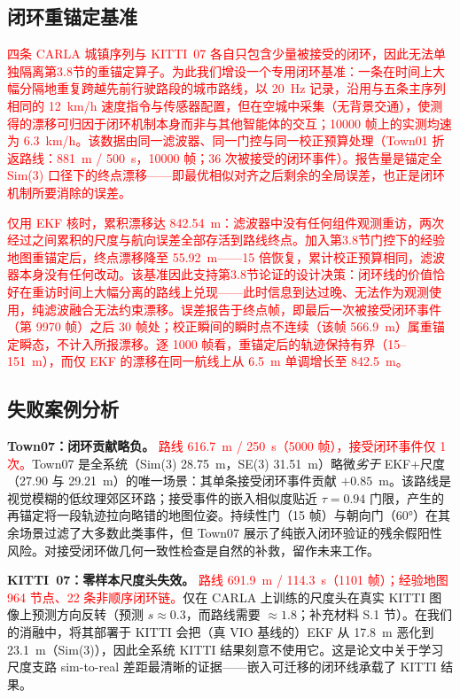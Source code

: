 \subsection{闭环重锚定基准}
\label{sec:loop_benchmark}

\textcolor{red}{四条 CARLA 城镇序列与 KITTI~07 各自只包含少量被接受的闭环，因此无法单独隔离第3.8节的重锚定算子。为此我们增设一个专用闭环基准：一条在时间上大幅分隔地重复跨越先前行驶路段的城市路线，以 20~Hz 记录，沿用与五条主序列相同的 12~km/h 速度指令与传感器配置，但在\textcolor{red}{空城}中采集（无背景交通），使测得的漂移可归因于闭环机制本身而非与其他智能体的交互；10000 帧上的实测均速为 6.3~km/h。该数据由同一滤波器、同一门控与同一校正预算处理\textcolor{red}{（Town01 折返路线：881~m / 500~s，10000 帧；36 次被接受的闭环事件）}。报告量是锚定全 Sim(3) 口径下的终点漂移——即最优相似对齐之后剩余的全局误差，也正是闭环机制所要消除的误差。}

\textcolor{red}{仅用 EKF 核时，累积漂移达 842.54~m：滤波器中没有任何组件观测重访，两次经过之间累积的尺度与航向误差全部存活到路线终点。加入第3.8节门控下的经验地图重锚定后，终点漂移降至 55.92~m——15 倍恢复，累计校正预算相同，滤波器本身没有任何改动。该基准因此支持第3.8节论证的设计决策：闭环线的价值恰好在重访时间上大幅分离的路线上兑现——此时信息到达过晚、无法作为观测使用，纯滤波融合无法约束漂移。误差报告于终点帧，即最后一次被接受闭环事件（第 9970 帧）之后 30 帧处；校正瞬间的瞬时点不连续（该帧 566.9~m）属重锚定瞬态，不计入所报漂移。逐 1000 帧看，重锚定后的轨迹保持有界（15--151~m），而仅 EKF 的漂移在同一航线上从 6.5~m 单调增长至 842.5~m。}

\subsection{失败案例分析}
\label{sec:failure_analysis}

\textbf{Town07：闭环贡献略负。} \textcolor{red}{路线 616.7~m / 250~s（5000 帧），接受闭环事件仅 1 次。}Town07 是全系统（Sim(3) 28.75~m，SE(3) 31.51~m）略微\emph{劣于} EKF+尺度（27.90 与 29.21~m）的唯一场景：其单条接受闭环事件贡献 $+0.85$~m。该路线是视觉模糊的低纹理郊区环路；接受事件的嵌入相似度贴近 $\tau=0.94$ 门限，产生的再锚定将一段轨迹拉向略错的地图位姿。持续性门（15 帧）与朝向门（60°）在其余场景过滤了大多数此类事件，但 Town07 展示了纯嵌入闭环验证的残余假阳性风险。对接受闭环做几何一致性检查是自然的补救，留作未来工作。

\textbf{KITTI~07：零样本尺度头失效。} \textcolor{red}{路线 691.9~m / 114.3~s（1101 帧）；经验地图 964 节点、22 条非顺序闭环链。}仅在 CARLA 上训练的尺度头在真实 KITTI 图像上预测方向反转（预测 $s\approx0.3$，而路线需要 $\approx1.8$；补充材料 S.1 节）。在我们的消融中，将其部署于 KITTI 会把（真 VIO 基线的）EKF 从 17.8~m 恶化到 23.1~m（Sim(3)），因此全系统 KITTI 结果刻意不使用它。这是论文中关于学习尺度支路 sim-to-real 差距最清晰的证据——嵌入可迁移的闭环线承载了 KITTI 结果。

